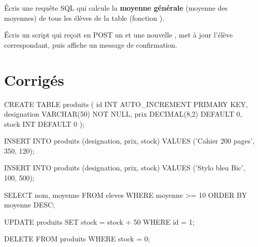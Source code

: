 Écris une requête SQL qui calcule la \textbf{moyenne générale} (moyenne des
moyennes) de tous les élèves de la table  (fonction ).

Écris un script  qui reçoit en POST un  et une
nouvelle , met à jour l'élève correspondant, puis affiche un
message de confirmation.

\section{Corrigés}

\begin{codesql}
CREATE TABLE produits (
  id          INT AUTO_INCREMENT PRIMARY KEY,
  designation VARCHAR(50) NOT NULL,
  prix        DECIMAL(8,2) DEFAULT 0,
  stock       INT DEFAULT 0
);
\end{codesql}

\begin{codesql}
INSERT INTO produits (designation, prix, stock)
VALUES ('Cahier 200 pages', 350, 120);

INSERT INTO produits (designation, prix, stock)
VALUES ('Stylo bleu Bic', 100, 500);
\end{codesql}

\begin{codesql}
SELECT nom, moyenne FROM eleves
WHERE moyenne >= 10
ORDER BY moyenne DESC;
\end{codesql}

\begin{codesql}
UPDATE produits SET stock = stock + 50 WHERE id = 1;
\end{codesql}

\begin{codesql}
DELETE FROM produits WHERE stock = 0;
\end{codesql}


